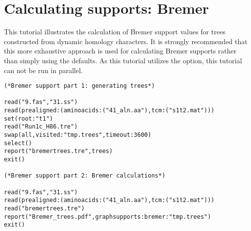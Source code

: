 


\section{Calculating supports: Bremer}{\label{tutorial4}}

This tutorial illustrates the calculation of Bremer support values 
for trees constructed from dynamic homology characters. 
It is strongly recommended that this more exhaustive approach 
is used for calculating Bremer supports rather than simply 
using the  defaults.  As this 
tutorial utilizes the  option, this 
tutorial can not be run in parallel.
    
\begin{verbatim}
(*Bremer support part 1: generating trees*)

read("9.fas","31.ss")
read(prealigned:(aminoacids:("41_aln.aa"),tcm:("s1t2.mat")))
set(root:"t1")
read("Run1c_H86.tre")
swap(all,visited:"tmp.trees",timeout:3600)
select()
report("bremertrees.tre",trees)
exit()

(*Bremer support part 2: Bremer calculations*)

read("9.fas","31.ss")
read(prealigned:(aminoacids:("41_aln.aa"),tcm:("s1t2.mat")))
read("bremertrees.tre")
report("Bremer_trees.pdf",graphsupports:bremer:"tmp.trees")
exit()
\end{verbatim}


